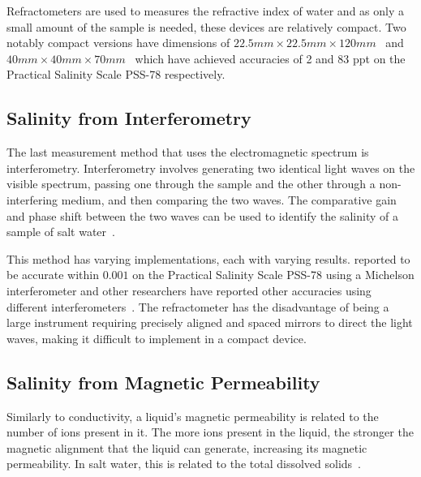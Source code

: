 Refractometers are used to measures the refractive index of water and as only a small amount of the sample is needed, these devices are relatively compact.
Two notably compact versions have dimensions of $22.5mm \times 22.5mm \times 120mm$~\cite{malarde_compact_refractometer_2008} and $40mm \times 40mm \times 70mm$~\cite{tengesdal_compact_refractometer_2012} which have achieved accuracies of 2 and 83 \gls{ppt} on the Practical Salinity Scale PSS-78 respectively.

\subsection{Salinity from Interferometry}

The last measurement method that uses the electromagnetic spectrum is interferometry.
Interferometry involves generating two identical light waves on the visible spectrum, passing one through the sample and the other through a non-interfering medium, and then comparing the two waves.
The comparative gain and phase shift between the two waves can be used to identify the salinity of a sample of salt water~\cite{liao_interferometer_seawater_salinity_2023}.

This method has varying implementations, each with varying results.
 reported to be accurate within $0.001$ on the Practical Salinity Scale PSS-78 using a Michelson interferometer and other researchers have reported other accuracies using different interferometers~\cite{possetti_interferometer_salinity_measurement_2009, nguyen_interferometer_salinity_measurement_2009, zhao_interferometer_salinity_measurement_2009}.
The refractometer has the disadvantage of being a large instrument requiring precisely aligned and spaced mirrors to direct the light waves, making it difficult to implement in a compact device. 

\subsection{Salinity from Magnetic Permeability}\label{subsec:salinity-from-electromagnetic-induction}

Similarly to conductivity, a liquid's magnetic permeability is related to the number of ions present in it.
The more ions present in the liquid, the stronger the magnetic alignment that the liquid can generate, increasing its magnetic permeability.
In salt water, this is related to the total dissolved solids~\cite{somaraju_electromagnetic_salinity_2006}.

